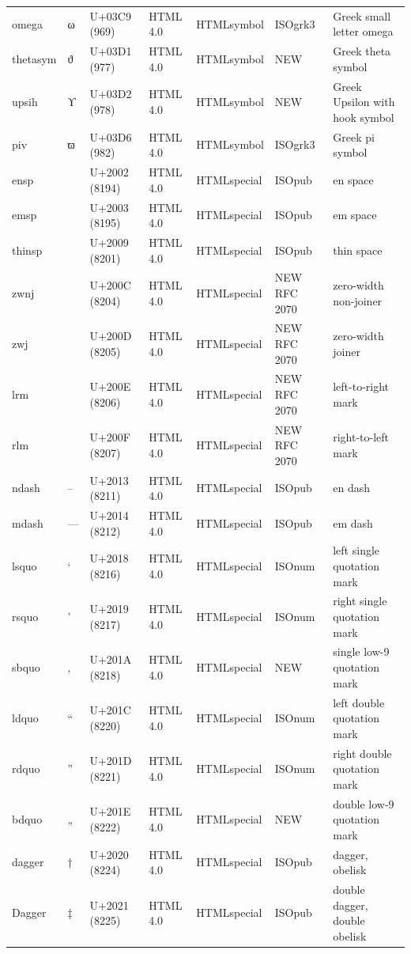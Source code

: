 \documentclass{article}
\begin{document}
\begin{tabular}{lllllll}
omega & ω & U+03C9 (969) & HTML 4.0 & HTMLsymbol & ISOgrk3 & Greek small letter omega \\
thetasym & ϑ & U+03D1 (977) & HTML 4.0 & HTMLsymbol & NEW & Greek theta symbol \\
upsih & ϒ & U+03D2 (978) & HTML 4.0 & HTMLsymbol & NEW & Greek Upsilon with hook symbol \\
piv & ϖ & U+03D6 (982) & HTML 4.0 & HTMLsymbol & ISOgrk3 & Greek pi symbol \\
ensp &  & U+2002 (8194) & HTML 4.0 & HTMLspecial & ISOpub & en space \\
emsp &  & U+2003 (8195) & HTML 4.0 & HTMLspecial & ISOpub & em space \\
thinsp &  & U+2009 (8201) & HTML 4.0 & HTMLspecial & ISOpub & thin space \\
zwnj &  & U+200C (8204) & HTML 4.0 & HTMLspecial & NEW RFC 2070 & zero-width non-joiner \\
zwj &  & U+200D (8205) & HTML 4.0 & HTMLspecial & NEW RFC 2070 & zero-width joiner \\
lrm &  & U+200E (8206) & HTML 4.0 & HTMLspecial & NEW RFC 2070 & left-to-right mark \\
rlm &  & U+200F (8207) & HTML 4.0 & HTMLspecial & NEW RFC 2070 & right-to-left mark \\
ndash & – & U+2013 (8211) & HTML 4.0 & HTMLspecial & ISOpub & en dash \\
mdash & — & U+2014 (8212) & HTML 4.0 & HTMLspecial & ISOpub & em dash \\
lsquo & ‘ & U+2018 (8216) & HTML 4.0 & HTMLspecial & ISOnum & left single quotation mark \\
rsquo & ’ & U+2019 (8217) & HTML 4.0 & HTMLspecial & ISOnum & right single quotation mark \\
sbquo & ‚ & U+201A (8218) & HTML 4.0 & HTMLspecial & NEW & single low-9 quotation mark \\
ldquo & “ & U+201C (8220) & HTML 4.0 & HTMLspecial & ISOnum & left double quotation mark \\
rdquo & ” & U+201D (8221) & HTML 4.0 & HTMLspecial & ISOnum & right double quotation mark \\
bdquo & „ & U+201E (8222) & HTML 4.0 & HTMLspecial & NEW & double low-9 quotation mark \\
dagger & † & U+2020 (8224) & HTML 4.0 & HTMLspecial & ISOpub & dagger, obelisk \\
Dagger & ‡ & U+2021 (8225) & HTML 4.0 & HTMLspecial & ISOpub & double dagger, double obelisk \\

\end{tabular}
\end{document}
